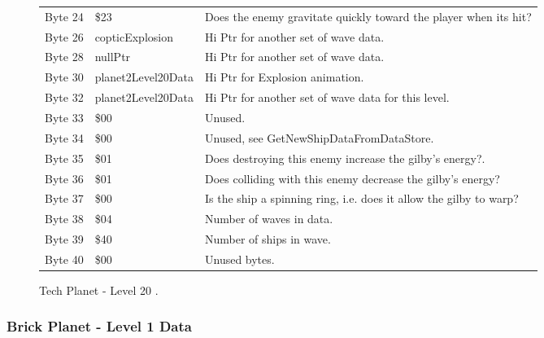 \begin{figure}[H]
{\begin{adjustbox}{width=12cm}
\begin{tabular}{lll}
 Byte 24 & \$23                & Does the enemy gravitate quickly toward the player when its hit?   \\
 Byte 26 & copticExplosion    & Hi Ptr for another set of wave data.                               \\
 Byte 28 & nullPtr            & Hi Ptr for another set of wave data.                               \\
 Byte 30 & planet2Level20Data & Hi Ptr for Explosion animation.                                    \\
 Byte 32 & planet2Level20Data & Hi Ptr for another set of wave data for this level.                \\
 Byte 33 & \$00                & Unused.                                                            \\
 Byte 34 & \$00                & Unused, see GetNewShipDataFromDataStore.                           \\
 Byte 35 & \$01                & Does destroying this enemy increase the gilby's energy?.           \\
 Byte 36 & \$01                & Does colliding with this enemy decrease the gilby's energy?        \\
 Byte 37 & \$00                & Is the ship a spinning ring, i.e. does it allow the gilby to warp? \\
 Byte 38 & \$04                & Number of waves in data.                                           \\
 Byte 39 & \$40                & Number of ships in wave.                                           \\
 Byte 40 & \$00                & Unused bytes.                                                      \\
\bottomrule
\end{tabular}

  \end{adjustbox}

  }\caption*{Tech Planet - Level 20
.}
\end{figure}

\clearpage
\subsubsection{Brick Planet - Level 1 Data}

